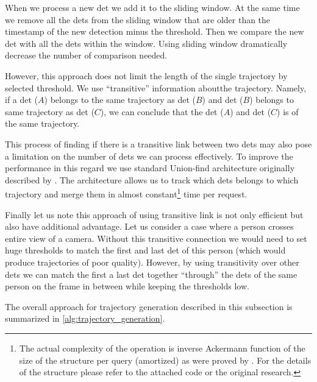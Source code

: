 When we process a new \gls{det} we add it to the sliding window. At the same time we remove all the \glspl{det} from the sliding window that are older than the timestamp of the new detection minus the threshold. Then we compare the new \gls{det} with all the \glspl{det} within the window. Using sliding window dramatically decrease the number of comparison needed.

However, this approach does not limit the length of the single trajectory by selected threshold. We use ``transitive'' information aboutthe trajectory. Namely, if a \gls{det} ($A$) belongs to the same trajectory as \gls{det} ($B$) and \gls{det} ($B$) belongs to same trajectory as \gls{det} ($C$), we can conclude that the \gls{det} ($A$) and \gls{det} ($C$) is of the same trajectory.

This process of finding if there is a transitive link between two \glspl{det} may also pose a limitation on the number of \glspl{det} we can process effectively. To improve the performance in this regard we use standard Union-find architecture originally described by \cite{galler1964improved}. The architecture allows us to track which \glspl{det} belongs to which trajectory and merge them in almost constant\footnote{The actual complexity of the operation is inverse Ackermann function of the size of the structure per query (amortized) as were proved by \cite{tarjan1984worst}. For the details of the structure please refer to the attached code or the original research.} time per request.

Finally let us note this approach of using transitive link is not only efficient but also have additional advantage. Let us consider a case where a person crosses entire view of a camera. Without this transitive connection we would need to set huge thresholds to match the first and last \gls{det} of this person (which would produce trajectories of poor quality). However, by using transitivity over other \glspl{det} we can match the first a last \gls{det} together ``through'' the \glspl{det} of the same person on the frame in between while keeping the thresholds low.

The overall approach for trajectory generation described in this subsection is summarized in \autoref{alg:trajectory_generation}.

